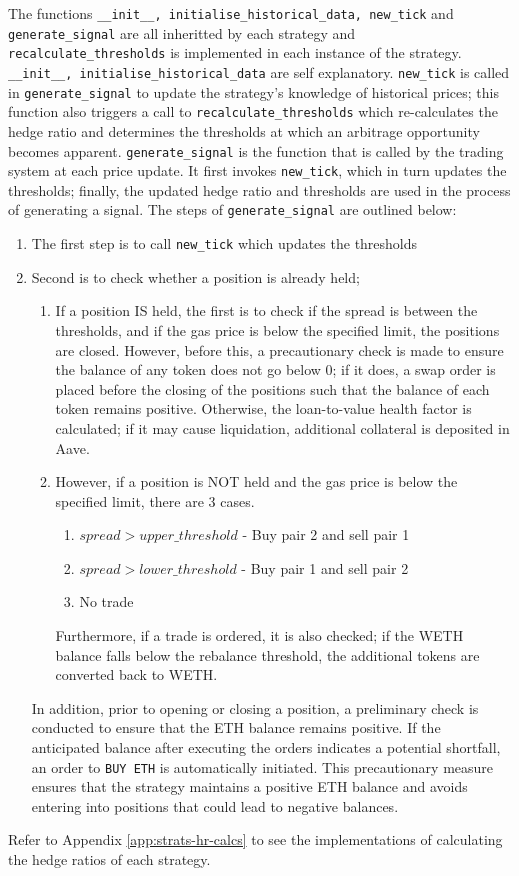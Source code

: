\noindent The functions \texttt{\_\_init\_\_,\ initialise\_historical\_data,\ new\_tick} and \texttt{generate\_signal} are all inheritted by each strategy and \texttt{recalculate\_thresholds} is implemented in each instance of the strategy. \texttt{\_\_init\_\_,\ initialise\_historical\_data} are self explanatory. \texttt{new\_tick} is called in \texttt{generate\_signal} to update the strategy's knowledge of historical prices; this function also triggers a call to \texttt{recalculate\_thresholds} which re-calculates the hedge ratio and determines the thresholds at which an arbitrage opportunity becomes apparent. \texttt{generate\_signal} is the function that is called by the trading system at each price update. It first invokes \texttt{new\_tick}, which in turn updates the thresholds; finally, the updated hedge ratio and thresholds are used in the process of generating a signal. The steps of \texttt{generate\_signal} are outlined below:
\begin{enumerate}
    \item The first step is to call \texttt{new\_tick} which updates the thresholds
    \item Second is to check whether a position is already held;
    \begin{enumerate}
        \item If a position IS held, the first is to check if the spread is between the thresholds, and if the gas price is below the specified limit, the positions are closed. However, before this, a precautionary check is made to ensure the balance of any token does not go below 0; if it does, a swap order is placed before the closing of the positions such that the balance of each token remains positive. Otherwise, the loan-to-value health factor is calculated; if it may cause liquidation, additional collateral is deposited in Aave.
        \item However, if a position is NOT held and the gas price is below the specified limit, there are 3 cases. \begin{enumerate}
            \item $spread > upper\_threshold$ - Buy pair 2 and sell pair 1
            \item $spread > lower\_threshold$ - Buy pair 1 and sell pair 2
            \item No trade
        \end{enumerate}
        Furthermore, if a trade is ordered, it is also checked; if the WETH balance falls below the rebalance threshold, the additional tokens are converted back to WETH.
    \end{enumerate}
    In addition, prior to opening or closing a position, a preliminary check is conducted to ensure that the ETH balance remains positive. If the anticipated balance after executing the orders indicates a potential shortfall, an order to \texttt{BUY\ ETH} is automatically initiated. This precautionary measure ensures that the strategy maintains a positive ETH balance and avoids entering into positions that could lead to negative balances.
\end{enumerate}
Refer to Appendix \ref{app:strats-hr-calcs} to see the implementations of calculating the hedge ratios of each strategy.

